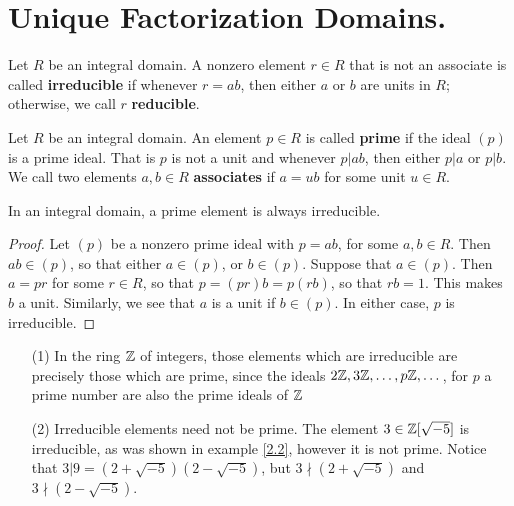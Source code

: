 \section{Unique Factorization Domains.}

\begin{definition}
    Let $R$ be an integral domain. A nonzero element  $r \in R$ that is not an
    associate is called \textbf{irreducible} if whenever $r=ab$, then either $a$
    or $b$ are units in $R$; otherwise, we call $r$ \textbf{reducible}.
\end{definition}

\begin{definition}
    Let $R$ be an integral domain. An element $p \in R$ is called \textbf{prime}
    if the ideal $(p)$ is a prime ideal. That is $p$ is not a unit and whenever
     $p|ab$, then either  $p|a$ or $p|b$. We call two elements $a,b \in R$
     \textbf{associates} if $a=ub$ for some unit $u \in R$.
\end{definition}

\begin{lemma}\label{2.3.1}
    In an integral domain, a prime element is always irreducible.
\end{lemma}
\begin{proof}
    Let $(p)$ be a nonzero prime ideal with $p=ab$, for some  $a,b \in R$. Then
     $ab \in (p)$, so that either $a \in (p)$, or $b \in (p)$. Suppose that $a
     \in (p)$. Then $a=pr$ for some  $r \in R$, so that  $p=(pr)b=p(rb)$, so
     that $rb=1$. This makes $b$ a unit. Similarly, we see that $a$ is a unit if
      $b \in (p)$. In either case, $p$ is irreducible.
\end{proof}

\begin{example}\label{2.6}
    \begin{enumerate}
        \item[(1)] In the ring $\mathbb{Z}$ of integers, those elements which are
            irreducible are precisely those which are prime, since the ideals
            $2\mathbb{Z}, 3\mathbb{Z}, \dots, p\mathbb{Z}, \dots$, for  $p$ a prime number are also the
            prime ideals of $\mathbb{Z}$

        \item[(2)] Irreducible elements need not be prime. The element $3 \in
            \mathbb{Z}[\sqrt{-5}]$ is irreducible, as was shown in example \ref{2.2},
            however it is not prime. Notice that
            $3|9=(2+\sqrt{-5})(2-\sqrt{-5})$, but $3 \nmid (2+\sqrt{-5})$ and
            $3 \nmid (2-\sqrt{-5})$.
    \end{enumerate}
\end{example}

